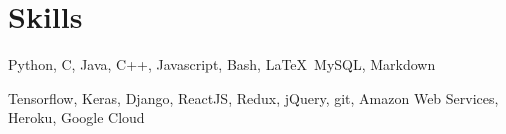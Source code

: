 
\section{Skills}
Python, C, Java, C++, Javascript, Bash, \LaTeX\, MySQL, Markdown
\sectionsep

Tensorflow, Keras, Django, ReactJS, Redux, jQuery, git, Amazon Web Services, Heroku, Google Cloud
\sectionsep